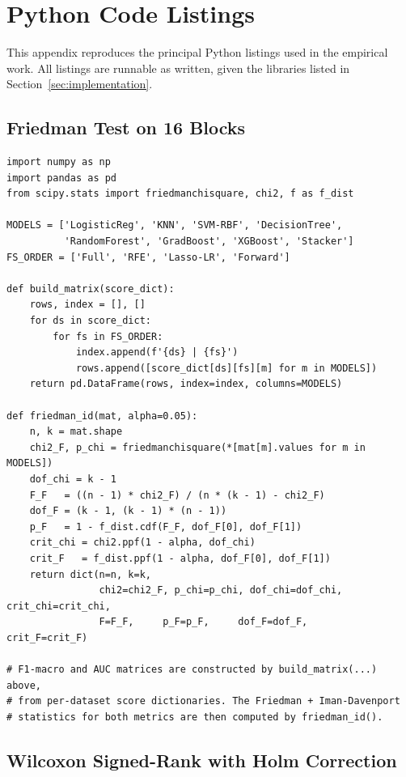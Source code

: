 \chapter{Python Code Listings}
\label{AppendixA}

This appendix reproduces the principal Python listings used in the
empirical work.  All listings are runnable as written, given the
libraries listed in Section~\ref{sec:implementation}.

\section{Friedman Test on 16 Blocks}

\begin{lstlisting}
import numpy as np
import pandas as pd
from scipy.stats import friedmanchisquare, chi2, f as f_dist

MODELS = ['LogisticReg', 'KNN', 'SVM-RBF', 'DecisionTree',
          'RandomForest', 'GradBoost', 'XGBoost', 'Stacker']
FS_ORDER = ['Full', 'RFE', 'Lasso-LR', 'Forward']

def build_matrix(score_dict):
    rows, index = [], []
    for ds in score_dict:
        for fs in FS_ORDER:
            index.append(f'{ds} | {fs}')
            rows.append([score_dict[ds][fs][m] for m in MODELS])
    return pd.DataFrame(rows, index=index, columns=MODELS)

def friedman_id(mat, alpha=0.05):
    n, k = mat.shape
    chi2_F, p_chi = friedmanchisquare(*[mat[m].values for m in MODELS])
    dof_chi = k - 1
    F_F   = ((n - 1) * chi2_F) / (n * (k - 1) - chi2_F)
    dof_F = (k - 1, (k - 1) * (n - 1))
    p_F   = 1 - f_dist.cdf(F_F, dof_F[0], dof_F[1])
    crit_chi = chi2.ppf(1 - alpha, dof_chi)
    crit_F   = f_dist.ppf(1 - alpha, dof_F[0], dof_F[1])
    return dict(n=n, k=k,
                chi2=chi2_F, p_chi=p_chi, dof_chi=dof_chi, crit_chi=crit_chi,
                F=F_F,     p_F=p_F,     dof_F=dof_F,       crit_F=crit_F)

# F1-macro and AUC matrices are constructed by build_matrix(...) above,
# from per-dataset score dictionaries. The Friedman + Iman-Davenport
# statistics for both metrics are then computed by friedman_id().
\end{lstlisting}

\section{Wilcoxon Signed-Rank with Holm Correction}

